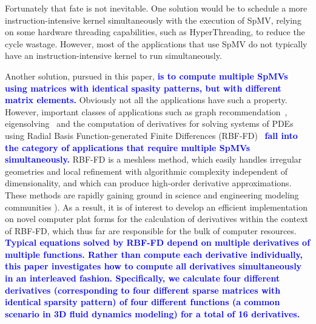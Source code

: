 \documentclass{sig-alternate}
\def\blue#1{\textbf{\textcolor{blue}{#1}}}
\def\ge#1{{\blue{#1}}}
\begin{document}
Fortunately that fate is not inevitable. One solution would be to
schedule a more instruction-intensive kernel simultaneously with the
execution of SpMV, relying on some hardware threading capabilities,
such as HyperThreading, to reduce the cycle wastage. However, most of 
the applications that use SpMV do not typically have an 
instruction-intensive kernel to run simultaneously.

Another solution, pursued in this paper, \ge{is to compute multiple SpMVs using matrices with identical spasity patterns, but with different matrix elements.}  Obviously not all the applications have such a property. However, important classes of applications such as graph recommendation~\cite{Kucuktunc13-SNAM}, eigensolving~\cite{LOBPCG} and the computation of derivatives for solving systems of PDEs using Radial Basis Function-generated Finite Differences (RBF-FD)~\cite{FLBWSC12} \ge{fall into the category of applications that require multiple SpMVs simultaneously.} RBF-FD is a meshless method, which easily handles irregular geometries and local refinement with algorithmic complexity independent of dimensionality, 
and which can produce high-order derivative approximations. These methods are rapidly gaining 
ground in science and engineering modeling communities \cite{Bayona13,CDNT,FoL11,FLBWSC12,SPLM}). 
As a result, it is of interest to develop an efficient implementation on novel computer plat
forms for the calculation of derivatives within the context of RBF-FD, which thus far are responsible 
for the bulk of computer resources. \ge{Typical equations solved by RBF-FD depend on multiple derivatives
of multiple functions. Rather than compute each derivative individually, this paper investigates 
how to compute all derivatives simultaneously in an interleaved fashion. Specifically, 
we calculate four different derivatives (corresponding to four different sparse matrices with identical 
sparsity pattern) of four different functions
(a common scenario in 3D fluid dynamics modeling) for a total of 16 derivatives. }
\end{document}
